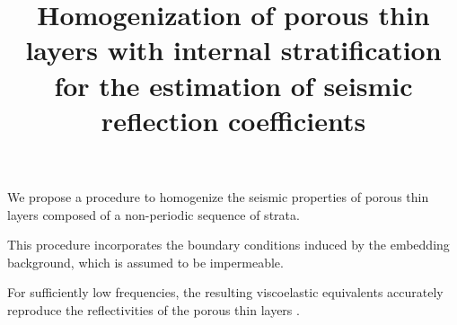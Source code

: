 \documentclass[draft]{agujournal2019}
\begin{document}

\title{Homogenization of porous thin layers with internal stratification for the estimation of seismic reflection coefficients }
%
%






\begin{keypoints}
\item We propose a procedure to homogenize the seismic properties of porous thin layers composed of a non-periodic sequence of strata.
\item This procedure incorporates the boundary conditions induced by the embedding  background, which is assumed to be impermeable.
\item For sufficiently low frequencies, the resulting viscoelastic equivalents accurately reproduce the reflectivities of the porous thin layers .

\end{keypoints}

\end{document}
